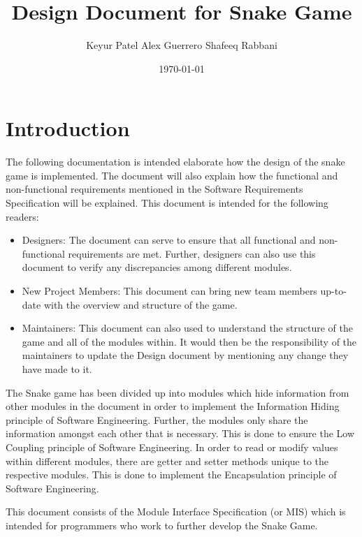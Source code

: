 \documentclass[12pt]{article}
\begin{document}
\title{Design Document for Snake Game} 
\author{Keyur Patel
Alex Guerrero
Shafeeq Rabbani}
\date{\today}
	
\maketitle

\tableofcontents

\newpage

\section{Introduction}

The following documentation is intended elaborate how the design of the snake game is implemented. The document will also explain how the functional and non-functional requirements mentioned in the Software Requirements Specification will be explained. This document is intended for the following readers:

\begin{itemize}
\item Designers: The document can serve to ensure that all functional and non-functional requirements are met. Further, designers can also use this document to verify any discrepancies among different modules.

\item New Project Members: This document can bring new team members up-to-date with the overview and structure of the game.

\item Maintainers: This document can also used to understand the structure of the game and all of the modules within. It would then be the responsibility of the maintainers to update the Design document by mentioning any change they have made to it.
\end{itemize}

The Snake game has been divided up into modules which hide information from other modules in the document in order to implement the Information Hiding principle of Software Engineering. Further, the modules only share the information amongst each other that is necessary. This is done to ensure the Low Coupling principle of Software Engineering. In order to read or modify values within different modules, there are getter and setter methods unique to the respective modules. This is done to implement the Encapsulation principle of Software Engineering.

This document consists of the Module Interface Specification (or MIS) which is intended for programmers who work to further develop the Snake Game.
\end{document}
